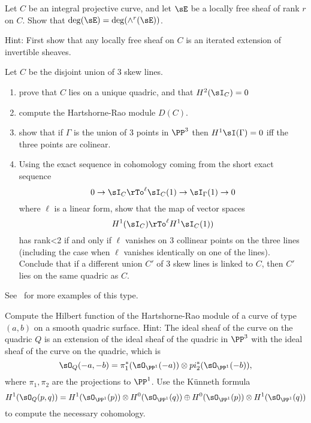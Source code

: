 \begin{exercise}
 Let $C$ be an integral projective curve, and let $\sE$ be a locally free sheaf of rank $r$ on $C$. Show that
 $\deg(\sE) = \deg(\wedge^r(\sE))$.
 
 Hint: First show that any locally free sheaf on $C$ is an iterated extension of invertible sheaves.
\end{exercise}

\begin{exercise}
Let $C$ be the disjoint union of 3 skew lines. 
\begin{enumerate}
 \item prove that $C$ lies on a unique quadric, and that $H^2(\sI_C) = 0$
 \item compute the Hartshorne-Rao module $D(C)$.
 \item show that if $\Gamma$ is the union of 3 points in $\PP^3$ then
 $H^1\sI(\Gamma) = 0$ iff the three points are colinear.
 \item Using the exact sequence in cohomology coming from the short exact sequence
$$
0\to \sI_C \rTo^{\ell} \sI_C(1) \to \sI_\Gamma(1) \to 0
$$
where $\ell$ is a linear form, show that the map of vector spaces
$$
H^1(\sI_C) \rTo^{\ell} H^1\sI_C(1))
$$
has rank<2 if and only if $\ell$ vanishes on 3 collinear points on the three lines (including the case when $\ell$ vanishes identically on one of the lines).
Conclude that if a different union $C'$ of 3 skew lines is linked to $C$, then $C'$ lies on the same quadric as $C$.
\end{enumerate}
See~\cite{Migliore} for more examples of this type.
\end{exercise}

\begin{exercise}
 Compute the Hilbert function of the Hartshorne-Rao module of a curve of type $(a,b)$ on a smooth quadric surface.
 Hint: The ideal sheaf of the curve on the quadric $Q$ is an extension of the ideal sheaf of the quadric in $\PP^3$
 with the ideal sheaf of the curve on the quadric, which is 
 $$
 \sO_Q(-a,-b) = \pi_1^*(\sO_{\PP^1}(-a)) \otimes pi_2^*(\sO_{\PP^1}(-b)),
 $$
 where $\pi_1, \pi_2$ are the projections to $\PP^1$. Use the K\"unneth formula
 $$
 H^1(\sO_Q(p,q)) = H^1(\sO_{\PP^1}(p)) \otimes H^0(\sO_{\PP^1}(q)) \oplus
  H^0(\sO_{\PP^1}(p)) \otimes H^1(\sO_{\PP^1}(q))
 $$
  to compute the necessary cohomology.
\end{exercise}

